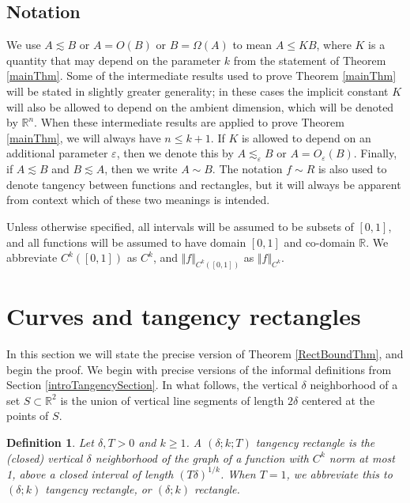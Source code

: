 \documentclass[letterpaper, reqno,11pt]{article}
\numberwithin{equation}{section}
\newcommand{\RR}{\mathbb{R}}
\newcommand{\eps}{\varepsilon}
\numberwithin{thm}{section}
\newtheorem{defn}[thm]{Definition}
\theoremstyle{remark}
\begin{document}

\subsection{Notation}
We use $A\lesssim B$ or $A = O(B)$ or $B = \Omega(A)$ to mean $A\leq KB$, where $K$ is a quantity that may depend on the parameter $k$ from the statement of Theorem \ref{mainThm}. Some of the intermediate results used to prove Theorem \ref{mainThm} will be stated in slightly greater generality; in these cases the implicit constant $K$ will also be allowed to depend on the ambient dimension, which will be denoted by $\RR^n$. When these intermediate results are applied to prove Theorem \ref{mainThm}, we will always have $n\leq k+1$. If $K$ is allowed to depend on an additional parameter $\eps$, then we denote this by $A\lesssim_\eps B$ or $A = O_\eps(B)$. Finally, if $A\lesssim B$ and $B\lesssim A$, then we write $A\sim B$. The notation $f\sim R$ is also used to denote tangency between functions and rectangles, but it will always be apparent from context which of these two meanings is intended.

Unless otherwise specified, all intervals will be assumed to be subsets of $[0,1]$, and all functions will be assumed to have domain $[0,1]$ and co-domain $\RR$. We abbreviate $C^k([0,1])$ as $C^k$, and $\Vert f \Vert_{C^k([0,1])}$ as $\Vert f \Vert_{C^k}.$



\section{Curves and tangency rectangles}\label{tangencyRectSection}
In this section we will state the precise version of Theorem \ref{RectBoundThm}, and begin the proof. We begin with precise versions of the informal definitions from Section \ref{introTangencySection}. In what follows, the vertical $\delta$ neighborhood of a set $S\subset\RR^2$ is the union of vertical line segments of length $2\delta$ centered at the points of $S$.


\begin{defn}\label{defnTangencyRectangle}
Let $\delta,T>0$ and $k\geq 1$. A $(\delta;k;T)$ \emph{tangency rectangle} is the (closed) vertical $\delta$ neighborhood of the graph of a function with $C^k$ norm at most 1, above a closed interval of length $(T\delta)^{1/k}$. When $T=1$, we abbreviate this to $(\delta;k)$ tangency rectangle, or $(\delta;k)$  rectangle.
\end{defn}
\end{document}

